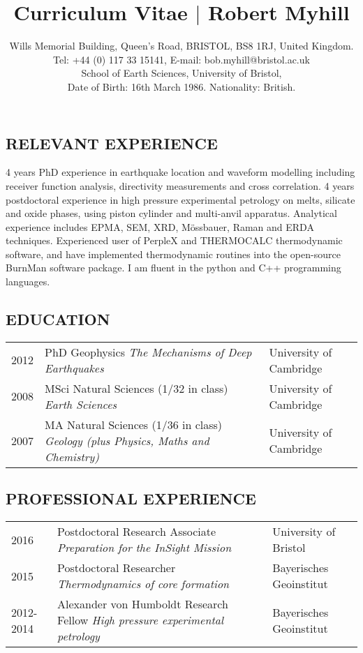 \documentclass[11pt,twoside,a4paper]{article}
\date{}
\title{Curriculum Vitae $\vert$ Robert Myhill}
\author{Wills Memorial Building, Queen’s Road, BRISTOL, BS8 1RJ, United Kingdom.\\
Tel: +44 (0) 117 33 15141, E-mail: bob.myhill@bristol.ac.uk\\
School of Earth Sciences, University of Bristol, \\
Date of Birth: 16th March 1986. Nationality: British.
}
\begin{document}
\maketitle

\subsection*{RELEVANT EXPERIENCE}
4 years PhD experience in earthquake location and waveform modelling including receiver function analysis, directivity measurements and cross correlation. 4 years postdoctoral experience in high pressure experimental petrology on melts, silicate and oxide phases, using piston cylinder and multi-anvil apparatus. Analytical experience includes EPMA, SEM, XRD, M\"{o}ssbauer, Raman and ERDA techniques. Experienced user of PerpleX and THERMOCALC thermodynamic software, and have implemented thermodynamic routines into the open-source BurnMan software package. I am fluent in the python and C++ programming languages.



\subsection*{EDUCATION}
\vspace{-0.5em}
\begin{table}[!h]
\centering
\begin{tabular}{L{2cm} L{10cm} L{5cm}}
2012 & PhD Geophysics \newline \emph{The Mechanisms of Deep Earthquakes} & University of Cambridge \\
2008 & MSci Natural Sciences (1/32 in class) \newline \emph{Earth Sciences} & University of Cambridge \\
2007 & MA Natural Sciences (1/36 in class) \newline \emph{Geology (plus Physics, Maths and Chemistry)} & University of Cambridge
\end{tabular}
\end{table}
\vspace{-1.5em}
\subsection*{PROFESSIONAL EXPERIENCE}

\vspace{-0.5em}
\begin{table}[!h]
\centering
\begin{tabular}{L{2cm} L{10cm} L{5cm}}
2016 & Postdoctoral Research Associate \newline \emph{Preparation for the InSight Mission} & University of Bristol \\
2015 & Postdoctoral Researcher \newline \emph{Thermodynamics of core formation} & Bayerisches Geoinstitut \\
2012-2014 & Alexander von Humboldt Research Fellow \newline \emph{High pressure experimental petrology} & Bayerisches Geoinstitut 
\end{tabular}
\end{table}
\vspace{-1.5em}
\end{document}
